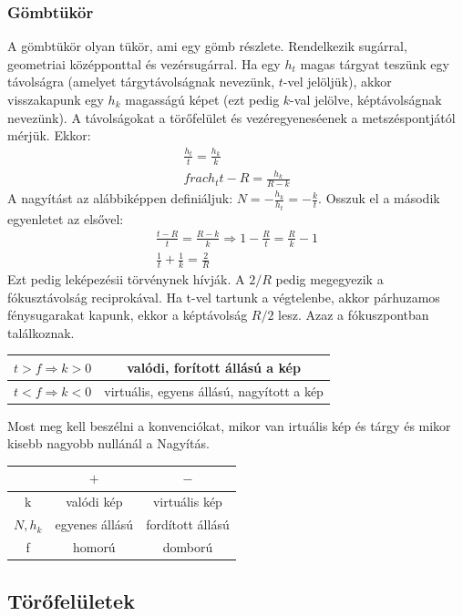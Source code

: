\documentclass{article}
\begin{document}
\subsubsection{Gömbtükör}
A gömbtükör olyan tükör, ami egy gömb részlete. Rendelkezik sugárral, geometriai középponttal és vezérsugárral. Ha egy $h_t$ magas tárgyat teszünk egy  távolságra (amelyet tárgytávolságnak nevezünk, $t$-vel jelöljük), akkor visszakapunk egy $h_k$ magasságú képet (ezt pedig $k$-val jelölve, képtávolságnak nevezünk). A távolságokat a törőfelület és vezéregyeneséenek a metszéspontjától mérjük. Ekkor:
\begin{gather*}
\frac{h_t}{t} = \frac{h_k}{k} \\
frac{h_t}{t-R} = \frac{h_k}{R-k}
\end{gather*}
A nagyítást az alábbiképpen definiáljuk: $N=-\frac{h_k}{h_t} = -\frac{k}{t}$. Osszuk el a második egyenletet az elsővel:
\begin{gather*}
\frac{t-R}{t} = \frac{R-k}{k} \Rightarrow 1-\frac{R}{t} = \frac{R}{k}-1 \\
\frac{1}{t} + \frac{1}{k} = \frac{2}{R}
\end{gather*}
Ezt pedig leképezésii törvénynek hívják. A $2/R$ pedig megegyezik a fókusztávolság reciprokával. Ha t-vel tartunk a végtelenbe, akkor párhuzamos fénysugarakat kapunk, ekkor a képtávolság $R/2$ lesz. Azaz a fókuszpontban találkoznak.
\begin{center}
\begin{tabular}{c|c}
$t>f \Rightarrow k>0$ & valódi, forított állású a kép \\ \hline
$t<f \Rightarrow k<0$ & virtuális, egyens állású, nagyított a kép
\end{tabular}
\end{center}
Most meg kell beszélni a konvenciókat, mikor van irtuális kép és tárgy és mikor kisebb nagyobb nullánál a Nagyítás.
\begin{center}
\begin{tabular}{c|cc}
& $\boxed{+}$ & $\boxed{-}$ \\ \hline 
k & valódi kép & virtuális kép \\
$N,h_k$ & egyenes állású & fordított állású \\
f & homorú & domború
\end{tabular}
\end{center}
\subsection{Törőfelületek}
\end{document}
